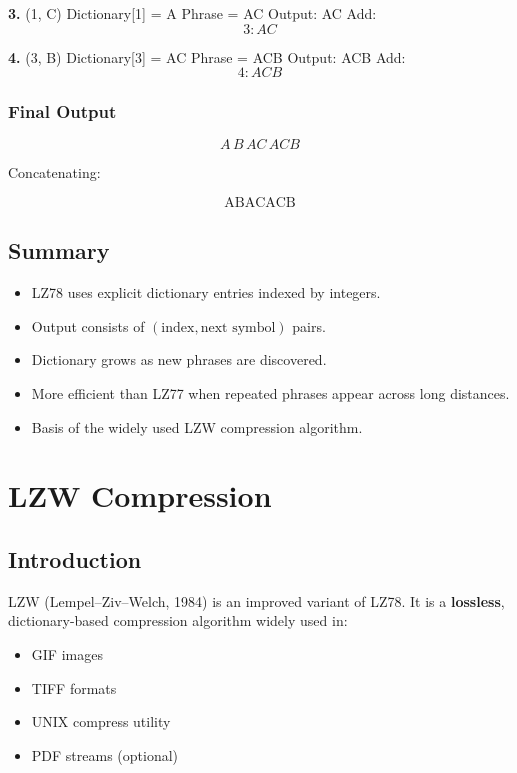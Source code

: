 \documentclass{AnantDocumentation}
\begin{document}
\textbf{3. } (1, C)  
Dictionary[1] = A  
Phrase = AC  
Output: AC  
Add:
\[
3: AC
\]

\textbf{4. } (3, B)  
Dictionary[3] = AC  
Phrase = ACB  
Output: ACB  
Add:
\[
4: ACB
\]

\subsubsection*{Final Output}

\[
\boxed{A\, B\, AC\, ACB}
\]

Concatenating:

\[
\boxed{\text{ABACACB}}
\]

\subsection{Summary}

\begin{itemize}
\item LZ78 uses explicit dictionary entries indexed by integers.
\item Output consists of \((\text{index}, \text{next symbol})\) pairs.
\item Dictionary grows as new phrases are discovered.
\item More efficient than LZ77 when repeated phrases appear across long distances.
\item Basis of the widely used LZW compression algorithm.
\end{itemize}

\section{LZW Compression}

\subsection{Introduction}

LZW (Lempel–Ziv–Welch, 1984) is an improved variant of LZ78.  
It is a \textbf{lossless}, dictionary-based compression algorithm widely used in:

\begin{itemize}
\item GIF images
\item TIFF formats
\item UNIX compress utility
\item PDF streams (optional)
\end{itemize}
\end{document}
